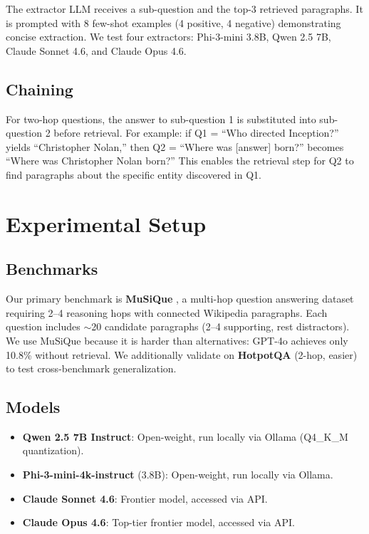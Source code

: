 \documentclass[11pt]{article}
\begin{document}
The extractor LLM receives a sub-question and the top-3 retrieved paragraphs. It is prompted with 8 few-shot examples (4 positive, 4 negative) demonstrating concise extraction. We test four extractors: Phi-3-mini 3.8B, Qwen 2.5 7B, Claude Sonnet 4.6, and Claude Opus 4.6.

\subsection{Chaining}

For two-hop questions, the answer to sub-question 1 is substituted into sub-question 2 before retrieval. For example: if Q1 = ``Who directed Inception?'' yields ``Christopher Nolan,'' then Q2 = ``Where was [answer] born?'' becomes ``Where was Christopher Nolan born?'' This enables the retrieval step for Q2 to find paragraphs about the specific entity discovered in Q1.

\section{Experimental Setup}
\label{sec:setup}

\subsection{Benchmarks}

Our primary benchmark is \textbf{MuSiQue} \citep{trivedi2022musique}, a multi-hop question answering dataset requiring 2--4 reasoning hops with connected Wikipedia paragraphs. Each question includes $\sim$20 candidate paragraphs (2--4 supporting, rest distractors). We use MuSiQue because it is harder than alternatives: GPT-4o achieves only 10.8\% without retrieval. We additionally validate on \textbf{HotpotQA} \citep{yang2018hotpotqa} (2-hop, easier) to test cross-benchmark generalization.

\subsection{Models}

\begin{itemize}[nosep]
    \item \textbf{Qwen 2.5 7B Instruct}: Open-weight, run locally via Ollama (Q4\_K\_M quantization).
    \item \textbf{Phi-3-mini-4k-instruct} (3.8B): Open-weight, run locally via Ollama.
    \item \textbf{Claude Sonnet 4.6}: Frontier model, accessed via API.
    \item \textbf{Claude Opus 4.6}: Top-tier frontier model, accessed via API.
\end{itemize}
\end{document}
